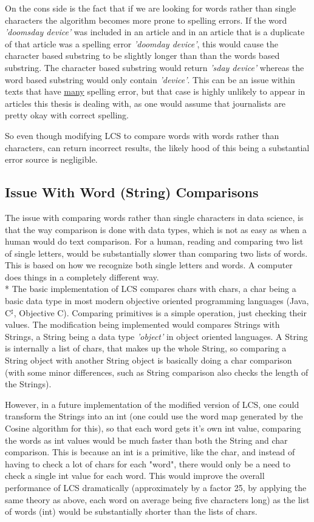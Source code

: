 On the cons side is the fact that if we are looking for words rather than single characters the algorithm becomes more prone to spelling errors. If the word \textit{'doomsday device'} was included in an article and in an article that is a duplicate of that article was a spelling error \textit{'doomday device'}, this would cause the character based substring to be slightly longer than than the words based substring. The character based substring would return \textit{'sday device'} whereas the word based substring would only contain \textit{'device'}. This can be an issue within texts that have \underline{many} spelling error, but that case is highly unlikely to appear in articles this thesis is dealing with, as one would assume that journalists are pretty okay with correct spelling. 

So even though modifying LCS to compare words with words rather than characters, can return incorrect results, the likely hood of this being a substantial error source is negligible.

\subsection{Issue With Word (String) Comparisons}
The issue with comparing words rather than single characters in data science, is that the way comparison is done with data types, which is not as easy as when a human would do text comparison. For a human, reading and comparing two list of single letters, would be substantially slower than comparing two lists of words. This is based on how we recognize both single letters and words. A computer does things in a completely different way.\\* The basic implementation of LCS compares chars with chars, a char being a basic data type in most modern objective oriented programming languages (Java, C$^\sharp$, Objective C). Comparing primitives is a simple operation, just checking their values. The modification being implemented would compares Strings with Strings, a String being a data type \textit{'object'} in object oriented languages. A String is internally a list of chars, that makes up the whole String, so comparing a String object with another String object is basically doing a char comparison (with some minor differences, such as String comparison also checks the length of the Strings).

However, in a future implementation of the modified version of LCS, one could transform the Strings into an int (one could use the word map generated by the Cosine algorithm for this), so that each word gets it's own int value, comparing the words as int values would be much faster than both the String and char comparison. This is because an int is a primitive, like the char, and instead of having to check a lot of chars for each "word", there would only be a need to check a single int value for each word. This would improve the overall performance of LCS dramatically (approximately by a factor 25, by applying the same theory as above, each word on average being five characters long) as the list of words (int) would be substantially shorter than the lists of chars. 

